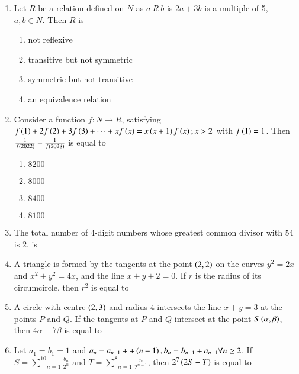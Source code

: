 \documentclass[journal]{IEEEtran}
\begin{document}
\begin{enumerate}
    \item Let $R$ be a relation defined on $N$ as $a\ R\ b$ is $2a+3b$ is a multiple of 5, $a,b\in N$. Then $R$ is

		\begin{multicols}{2}
			\begin{enumerate}
				\item not reflexive
				\item transitive but not symmetric
				\item symmetric but not transitive
				\item an equivalence relation
			\end{enumerate}
		\end{multicols}

    \item Consider a function $f:N\to R$, satisfying $f\left(1\right)+2f\left(2\right)+3f\left(3\right)+\cdots+xf\left(x\right)=x\left(x+1\right)f\left(x\right);x>2$ with $f\left(1\right)=1$. Then $\frac{1}{f\left(2022\right)}+\frac{1}{f\left(2028\right)}$ is equal to 

		\begin{multicols}{4}
			\begin{enumerate}
				\item $8200$
				\item $8000$
				\item $8400$
				\item $8100$
			\end{enumerate}
		\end{multicols}
  
    \item The total number of $4$-digit numbers whose greatest common divisor with $54$ is $2$, is

    \item A triangle is formed by the tangents at the point $\left(2,2\right)$ on the curves $y^2=2x$ and $x^2+y^2=4x$, and the line $x+y+2=0$. If $r$ is the radius of its circumcircle, then $r^2$ is equal to
		
    \item A circle with centre $\left(2,3\right)$ and radius $4$ intersects the line $x+y=3$ at the points $P$ and $Q$. If the tangents at $P$ and $Q$ intersect at the point $S\left(\alpha,\beta\right)$, then $4\alpha-7\beta$ is equal to

    \item Let $a_1=b_1=1$ and $a_n=a_{n-1}++\left(n-1\right),b_n=b_{n-1}+a_{n-1}\forall n\geq2$. If $S=\underset{n=1}{\overset{10}{\sum}}\frac{b_n}{2^n}$ and $T=\underset{n=1}{\overset{8}{\sum}}\frac{n}{2^{n-1}}$, then $2^7\left(2S-T\right)$ is equal to


\end{enumerate}
\end{document}
